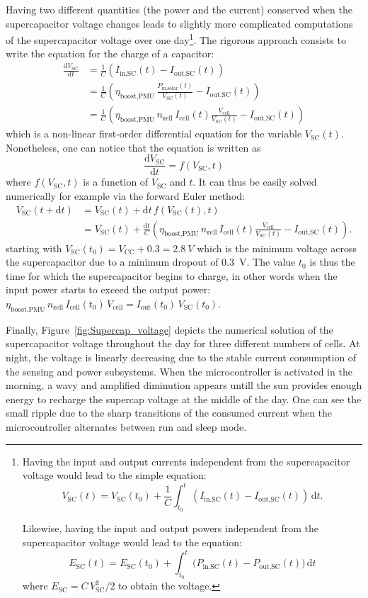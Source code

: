 \documentclass{EPL-master-thesis-covers-EN}
\newcommand{\te}[1]{\textrm{#1}}
\begin{document}
Having two different quantities (the power and the current) conserved when the supercapacitor voltage changes leads to slightly more complicated computations of the supercapacitor voltage over one day\footnote{Having the input and output currents independent from the supercapacitor voltage would lead to the simple equation: $$V_\te{SC}(t) = V_\te{SC}(t_0) + \frac{1}{C} \int_{t_0}^t (I_\te{in,SC}(t) - I_\te{out,SC}(t))\, \te{d}t.$$

Likewise, having the input and output powers independent from the supercapacitor voltage would lead to the equation: $$E_\te{SC}(t) = E_\te{SC}(t_0) + \int_{t_0}^t \big(P_\te{in,SC}(t) - P_\te{out,SC}(t)\big)\, \te{d}t$$ where $E_\te{SC} = C\, V_\te{SC}^2 / 2$ to obtain the voltage.}. The rigorous approach consists to write the equation for the charge of a capacitor:
\begin{align*}
 \frac{\te{d}V_\te{SC}}{\te{d}t} &= \frac{1}{C} \left( I_\te{in,SC}(t) - I_\te{out,SC}(t) \right) \\
 &= \frac{1}{C} \left( \eta_\te{boost,PMU} \, \frac{P_\te{in,solar}(t)}{V_\te{SC}(t)} - I_\te{out,SC}(t) \right) \\
 &= \frac{1}{C} \left( \eta_\te{boost,PMU} \, n_\te{¢ell} \, I_\te{cell}(t) \frac{V_\te{cell}}{V_\te{SC}(t)} - I_\te{out,SC}(t) \right)
\end{align*}
which is a non-linear first-order differential equation for the variable $V_\te{SC}(t)$. Nonetheless, one can notice that the equation is written as
\[
 \frac{\te{d}V_\te{SC}}{\te{d}t} = f(V_\te{SC}, t)
\]
where $f(V_\te{SC}, t)$ is a function of $V_\te{SC}$ and $t$. It can thus be easily solved numerically for example via the forward Euler method: 
\begin{align*}
 V_\te{SC}(t + \te{d}t) &= V_\te{SC}(t) + \te{d}t \, f(V_\te{SC}(t), t) \\
 &= V_\te{SC}(t) + \frac{\te{d}t}{C} \left( \eta_\te{boost,PMU} \, n_\te{¢ell} \, I_\te{cell}(t) \frac{V_\te{cell}}{V_\te{SC}(t)} - I_\te{out,SC}(t) \right).
\end{align*}
starting with $V_\te{SC}(t_0) = V_\te{CC} + 0.3 = \SI{2.8}{V}$ which is the minimum voltage across the supercapacitor due to a minimum dropout of \SI{0.3}{V}. The value $t_0$ is thus the time for which the supercapacitor begins to charge, in other words when the input power starts to exceed the output power: $\eta_\te{boost,PMU} \, n_\te{¢ell} \, I_\te{cell}(t_0)\,V_\te{cell} = I_\te{out}(t_0) \, V_\te{SC}(t_0)$.

Finally, Figure~\ref{fig:Supercap_voltage} depicts the numerical solution of the supercapacitor voltage throughout the day for three different numbers of cells. At night, the voltage is linearly decreasing due to the stable current consumption of the sensing and power subsystems. When the microcontroller is activated in the morning, a wavy and amplified diminution appears untill the sun provides enough energy to recharge the supercap voltage at the middle of the day. One can see the small ripple due to the sharp transitions of the consumed current when the microcontroller alternates between run and sleep mode.
\end{document}
